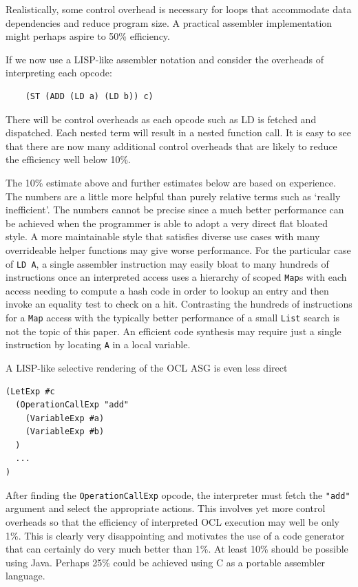 \documentclass[sigconf]{acmart}
\begin{document}
Realistically, some control overhead is necessary for loops that accommodate data dependencies and reduce program size. A practical assembler implementation might perhaps aspire to 50\% efficiency.

If we now use a LISP-like assembler notation and consider the overheads of interpreting each opcode:
  
\begin{verbatim}
	(ST (ADD (LD a) (LD b)) c)
\end{verbatim}

There will be control overheads as each opcode such as LD is fetched and dispatched. Each nested term will result in a nested function call. It is easy to see that there are now many additional control overheads that are likely to reduce the efficiency well below 10\%.

The 10\% estimate above and further estimates below are based on experience. The numbers are a little more helpful than purely relative terms such as `really inefficient'. The numbers cannot be precise since a much better performance can be achieved when the programmer is able to adopt a very direct flat bloated style. A more maintainable style that satisfies diverse use cases with many overrideable helper functions may give worse performance. For the particular case of \verb|LD A|, a single assembler instruction may easily bloat to many hundreds of instructions once an interpreted access uses a hierarchy of scoped \verb|Map|s with each access needing to compute a hash code in order to lookup an entry and then invoke an equality test to check on a hit. Contrasting the hundreds of instructions for a \verb|Map| access with the typically better performance of a small \verb|List| search is not the topic of this paper. An efficient code synthesis may require just a single instruction by locating \verb|A| in a local variable.

A LISP-like selective rendering of the OCL ASG is even less direct

\begin{verbatim}
(LetExp #c
  (OperationCallExp "add"
    (VariableExp #a)
    (VariableExp #b)
  )
  ...
)
\end{verbatim}

After finding the \verb|OperationCallExp| opcode, the interpreter must fetch the \verb|"add"| argument and select the appropriate actions. This involves yet more control overheads so that the efficiency of interpreted OCL execution may well be only 1\%. This is clearly very disappointing and motivates the use of a code generator that can certainly do very much better than 1\%. At least 10\% should be possible using Java. Perhaps 25\% could be achieved using C as a portable assembler language. 
\end{document}

